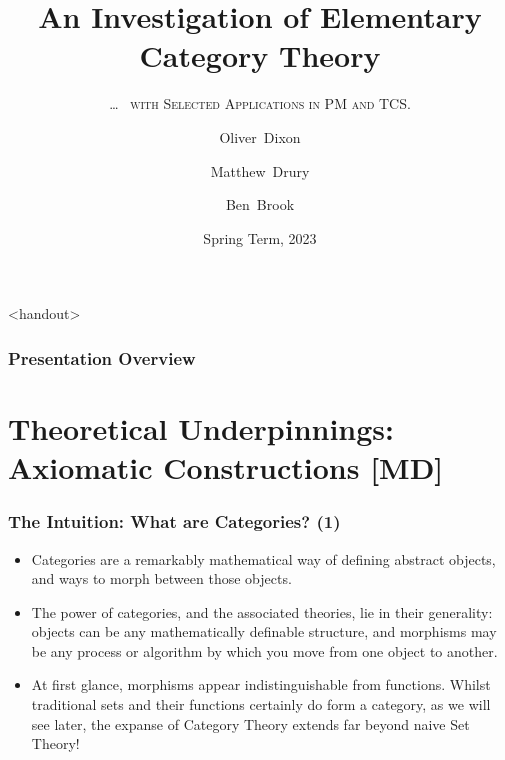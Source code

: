 \documentclass{beamer}
\title[Elementary Category Theory]%
        {An Investigation of Elementary Category Theory}
\subtitle{\ldots\ \fontfamily{lmr}%
        \textsc{with Selected Applications in PM and TCS.}}
\author[Dixon, Drury \& Brook]%
        {Oliver~Dixon \and Matthew~Drury \and Ben~Brook}
\institute[]{Department of Mathematics, University of York}
\date{Spring Term, 2023}
\numberwithin{figure}{section}
\begin{document}
\frame{\titlepage}

\begin{frame}<handout>
        \frametitle{Presentation Overview}
        \tableofcontents
\end{frame}

%
\section{Theoretical Underpinnings: Axiomatic Constructions [MD]}

\begin{frame}
        \frametitle{The Intuition: What are Categories? (1)}
        \begin{itemize}
                \item Categories are a remarkably mathematical way of defining
                        abstract objects, and ways to morph between those
                        objects.
                \item The power of categories, and the associated theories, lie
                        in their generality: objects can be any mathematically
                        definable structure, and morphisms may be any process or
                        algorithm by which you move from one object to another.
                \item At first glance, morphisms appear indistinguishable from
                        functions. Whilst traditional sets and their functions
                        certainly do form a category, as we will see later, the
                        expanse of Category Theory extends far beyond naive Set
                        Theory!
        \end{itemize}
\end{frame}
\end{document}
